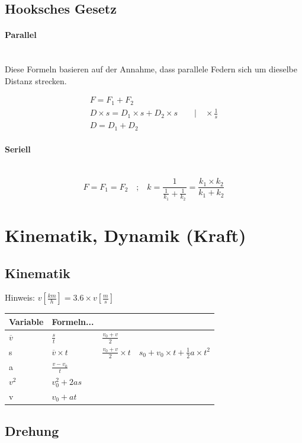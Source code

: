 \documentclass[a4paper,10pt]{article}
\newcommand{\lbparagraph}[1]{\paragraph{#1}\mbox{}\\}
\newcommand{\eqsp}[1]{\quad\textbf{;}\quad}
\begin{document}
\subsection{Hooksches Gesetz}

\lbparagraph{Parallel}

Diese Formeln basieren auf der Annahme, dass parallele Federn sich um dieselbe Distanz strecken.

\begin{gather}
    F = F_1 + F_2
    \\
    D \times s = D_1 \times s + D_2 \times s \qquad | \quad \times\frac{1}{s}
    \\
    D = D_1 + D_2
\end{gather}

\lbparagraph{Seriell}

\begin{equation}
    F = F_1 = F_2
    \eqsp{}
    k = \frac{1}{\frac{1}{k_1} + \frac{1}{k_2}} = \frac{k_1 \times k_2}{k_1 + k_2}
\end{equation}
    
\section{Kinematik, Dynamik (Kraft)}

\subsection{Kinematik}

Hinweis: $v[\frac{km}{h}] = 3.6 \times v[\frac{m}{s}]$ \newline

\begin{tabular}{l|l|l|l}
    Variable & Formeln... & & \\
    \hline
    $\overline{v}$ & $\frac{s}{t}$ & $\frac{v_0 + v}{2}$ & \\
    \hline
    s & $\overline{v} \times t$ & $\frac{v_0 + v}{2} \times t$ & $s_0 + v_0 \times t + \frac{1}{2}a \times t^2$ \\
    \hline
    a & $\frac{v - v_0}{t}$ & & \\
    \hline
    $v^2$ & $v_0^2 + 2as$ & & \\
    \hline
    v & $v_0 + at$ & &
\end{tabular}

\subsection{Drehung}
\end{document}
